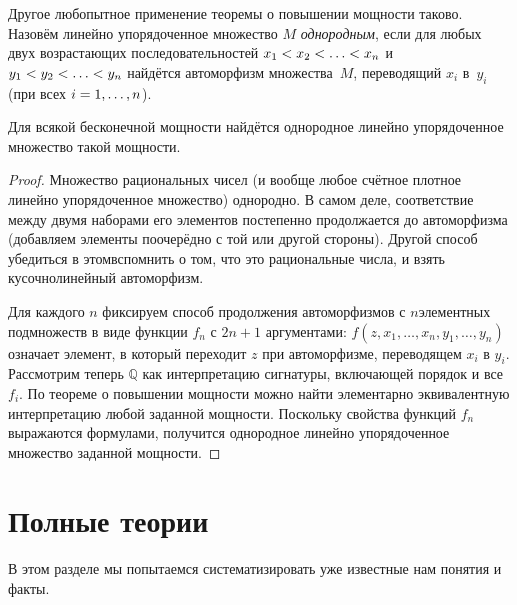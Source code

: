Другое любопытное применение теоремы о повышении мощности
таково. Назовём линейно упорядоченное множество $M$
\emph{однородным},%
%
если для любых двух возрастающих
последовательностей $x_1\hm<x_2\hm<\ldots\hm<x_n$ и
$y_1\hm<y_2\hm<\ldots\hm<y_n$ найдётся автоморфизм
множества~$M$, переводящий $x_i$ в~$y_i$ (при всех
$i\hm=1,\ldots,n$).

\begin{theorem}
Для всякой бесконечной мощности найдётся однородное линейно
упорядоченное множество такой мощности.
\end{theorem}

\begin{proof}
Множество рациональных чисел (и вообще любое счётное плотное
линейно упорядоченное множество) однородно. В самом деле,
соответствие между двумя наборами его элементов постепенно
продолжается до автоморфизма (добавляем
элементы поочерёдно с той или другой стороны). Другой способ
убедиться в этом\т вспомнить о том, что это рациональные числа,
и взять кусочно\д линейный автоморфизм.

Для каждого $n$ фиксируем способ продолжения автоморфизмов с
$n$\д элементных подмножеств в виде функции $f_n$ с $2n+1$
аргументами: $f(z,x_1,\dots,x_n,y_1,\dots,y_n)$ означает
элемент, в который переходит $z$ при автоморфизме, переводящем
$x_i$ в $y_i$. Рассмотрим теперь $\mathbb{Q}$ как интерпретацию
сигнатуры, включающей порядок и все $f_i$. По теореме о
повышении мощности можно найти элементарно эквивалентную
интерпретацию любой заданной мощности. Поскольку свойства
функций $f_n$ выражаются формулами, получится однородное
линейно упорядоченное множество заданной мощности.
\end{proof}

\section{Полные теории}

В этом разделе мы попытаемся систематизировать уже известные нам
понятия и факты.

